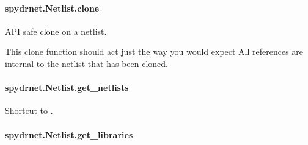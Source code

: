\documentclass[letterpaper,10pt,english,openany,oneside]{sphinxmanual}
\begin{document}
\paragraph{spydrnet.Netlist.clone}
\label{\detokenize{reference/classes/generated/spydrnet.Netlist.clone:spydrnet-netlist-clone}}\label{\detokenize{reference/classes/generated/spydrnet.Netlist.clone::doc}}

\begin{fulllineitems}
\label{\detokenize{reference/classes/generated/spydrnet.Netlist.clone:spydrnet.Netlist.clone}}
API safe clone on a netlist.

This clone function should act just the way you would expect
All references are internal to the netlist that has been cloned.

\end{fulllineitems}



\paragraph{spydrnet.Netlist.get\_netlists}
\label{\detokenize{reference/classes/generated/spydrnet.Netlist.get_netlists:spydrnet-netlist-get-netlists}}\label{\detokenize{reference/classes/generated/spydrnet.Netlist.get_netlists::doc}}

\begin{fulllineitems}
\label{\detokenize{reference/classes/generated/spydrnet.Netlist.get_netlists:spydrnet.Netlist.get_netlists}}
Shortcut to {\hyperref[\detokenize{reference/classes/generated/spydrnet.get_netlists:spydrnet.get_netlists}]{}}.

\end{fulllineitems}



\paragraph{spydrnet.Netlist.get\_libraries}
\label{\detokenize{reference/classes/generated/spydrnet.Netlist.get_libraries:spydrnet-netlist-get-libraries}}\label{\detokenize{reference/classes/generated/spydrnet.Netlist.get_libraries::doc}}
\end{document}
